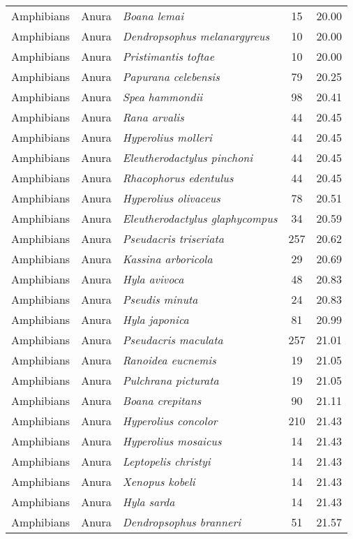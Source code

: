 \begin{longtable}{ll>{\itshape}lcc}
  Amphibians & Anura & Boana lemai &  15 & 20.00 \\ 
  Amphibians & Anura & Dendropsophus melanargyreus &  10 & 20.00 \\ 
  Amphibians & Anura & Pristimantis toftae &  10 & 20.00 \\ 
  Amphibians & Anura & Papurana celebensis &  79 & 20.25 \\ 
  Amphibians & Anura & Spea hammondii &  98 & 20.41 \\ 
  Amphibians & Anura & Rana arvalis &  44 & 20.45 \\ 
  Amphibians & Anura & Hyperolius molleri &  44 & 20.45 \\ 
  Amphibians & Anura & Eleutherodactylus pinchoni &  44 & 20.45 \\ 
  Amphibians & Anura & Rhacophorus edentulus &  44 & 20.45 \\ 
  Amphibians & Anura & Hyperolius olivaceus &  78 & 20.51 \\ 
  Amphibians & Anura & Eleutherodactylus glaphycompus &  34 & 20.59 \\ 
  Amphibians & Anura & Pseudacris triseriata & 257 & 20.62 \\ 
  Amphibians & Anura & Kassina arboricola &  29 & 20.69 \\ 
  Amphibians & Anura & Hyla avivoca &  48 & 20.83 \\ 
  Amphibians & Anura & Pseudis minuta &  24 & 20.83 \\ 
  Amphibians & Anura & Hyla japonica &  81 & 20.99 \\ 
  Amphibians & Anura & Pseudacris maculata & 257 & 21.01 \\ 
  Amphibians & Anura & Ranoidea eucnemis &  19 & 21.05 \\ 
  Amphibians & Anura & Pulchrana picturata &  19 & 21.05 \\ 
  Amphibians & Anura & Boana crepitans &  90 & 21.11 \\ 
  Amphibians & Anura & Hyperolius concolor & 210 & 21.43 \\ 
  Amphibians & Anura & Hyperolius mosaicus &  14 & 21.43 \\ 
  Amphibians & Anura & Leptopelis christyi &  14 & 21.43 \\ 
  Amphibians & Anura & Xenopus kobeli &  14 & 21.43 \\ 
  Amphibians & Anura & Hyla sarda &  14 & 21.43 \\ 
  Amphibians & Anura & Dendropsophus branneri &  51 & 21.57 \\ 

\end{longtable}

